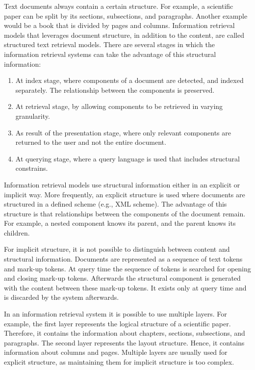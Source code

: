 Text documents always contain a certain structure. For example, a scientific paper can be split by its sections, subsections, and paragraphs. Another example would be a book that is divided by pages and columns. Information retrieval models that leverages document structure, in addition to the content, are called structured text retrieval models. There are several stages in which the information retrieval systems can take the advantage of this structural information:
\begin{enumerate}
  \item At index stage, where components of a document are detected, and indexed separately. The relationship between the components is preserved.
  \item At retrieval stage, by allowing components to be retrieved in varying granularity.
  \item As result of the presentation stage, where only relevant components are returned to the user and not the entire document.
  \item At querying stage, where a query language is used that includes structural constrains.
\end{enumerate}
Information retrieval models use structural information either in an explicit or implicit way. More frequently, an explicit structure is used where documents are structured in a defined scheme (e.g., XML scheme). The advantage of this structure is that relationships between the components of the document remain. For example, a nested component knows its parent, and the parent knows its children.

For implicit structure, it is not possible to distinguish between content and structural information. Documents are represented as a sequence of text tokens and mark-up tokens. At query time the sequence of tokens is searched for opening and closing mark-up tokens. Afterwards the structural component is generated with the content between these mark-up tokens.
It exists only at query time and is discarded by the system afterwards.

In an information retrieval system it is possible to use multiple layers. For example, the first layer represents the logical structure of a scientific paper. Therefore, it contains the information about chapters, sections, subsections, and paragraphs. The second layer represents the layout structure. Hence, it contains information about columns and pages. Multiple layers are usually used for explicit structure, as maintaining them for implicit structure is too complex.


